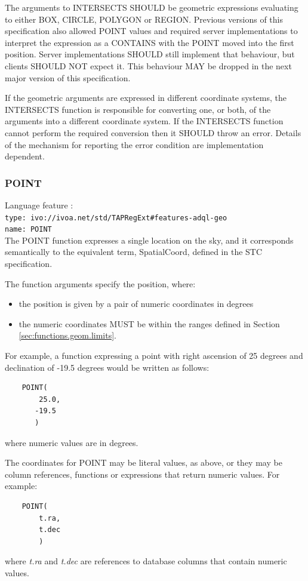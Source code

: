 \documentclass[11pt,a4paper]{ivoa}
\newcommand{\STCspec}{STC specification\xspace}
\newcommand{\SectionRef}[1]{Section \ref{#1}\xspace}
\begin{document}
The arguments to INTERSECTS SHOULD be geometric expressions evaluating to
either BOX, CIRCLE, POLYGON or REGION.
Previous versions of this
specification also allowed POINT values and required server implementations to
interpret the expression as a CONTAINS with the POINT moved into the first position.
Server implementations SHOULD still implement that behaviour, but clients
SHOULD NOT expect it.
This behaviour MAY be dropped in the next major version of this specification.

If the geometric arguments are expressed in different coordinate systems,
the INTERSECTS function is responsible for converting one, or both, of the
arguments into a different coordinate system.
If the INTERSECTS function cannot perform the required conversion then
it SHOULD throw an error.
Details of the mechanism for reporting the error condition are
implementation dependent.

\subsubsection{POINT}
\label{sec:functions.geom.point}
{\footnotesize Language feature :}\\
{\footnotesize \verb|type: ivo://ivoa.net/std/TAPRegExt#features-adql-geo|}\\
{\footnotesize \verb|name: POINT|}\\

The POINT function expresses a single location on the sky,
and it corresponds semantically to the equivalent term, SpatialCoord, defined in
the \STCspec.

The function arguments specify the position, where:
\begin{itemize}
    \item the position is given by a pair of numeric coordinates in degrees
    \item the numeric coordinates MUST be within the ranges defined in
    \SectionRef{sec:functions.geom.limits}.
\end{itemize}

For example, a function expressing a point with right ascension of 25 degrees
and declination of -19.5 degrees would be written as follows:
\begin{verbatim}
    POINT(
        25.0,
       -19.5
       )
\end{verbatim}
\noindent
where numeric values are in degrees.

The coordinates for POINT may be literal values, as above,
or they may be column references, functions or expressions that return
numeric values.
For example:
\begin{verbatim}
    POINT(
        t.ra,
        t.dec
        )
\end{verbatim}
\noindent
where \textit{t.ra} and \textit{t.dec} are references to database
columns that contain numeric values.
\end{document}
